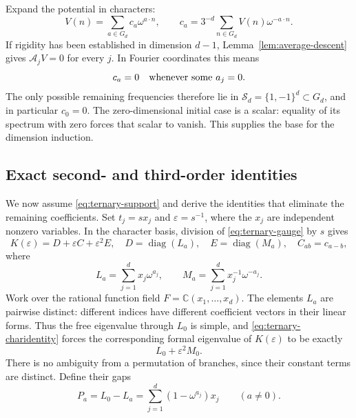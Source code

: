 \documentclass[11pt,a4paper]{article}
\theoremstyle{definition}
\theoremstyle{remark}\newtheorem{remark}[lemma]{Remark}
\newcommand{\C}{\mathbb C}\newcommand{\F}{\mathbb F}
\begin{document}
Expand the potential in characters:
\begin{equation}\label{eq:ternary-fourier}
 V(n)=\sum_{a\in G_d}c_a\omega^{a\cdot n},\qquad
 c_a=3^{-d}\sum_{n\in G_d}V(n)\omega^{-a\cdot n}.
\end{equation}
If rigidity has been established in dimension $d-1$,
Lemma~\ref{lem:average-descent} gives $\mathcal A_jV=0$ for every $j$.
In Fourier coordinates this means
\begin{equation}\label{eq:ternary-support}
 c_a=0\quad\hbox{whenever some }a_j=0.
\end{equation}
The only possible remaining frequencies therefore lie in
$\mathcal S_d=\{1,-1\}^d\subset G_d$, and in particular $c_0=0$.
The zero-dimensional initial case is a scalar: equality of its spectrum
with zero forces that scalar to vanish. This supplies the base for the
dimension induction.

\subsection{Exact second- and third-order identities}

We now assume \eqref{eq:ternary-support} and derive the identities that
eliminate the remaining coefficients. Set $t_j=sx_j$ and
$\varepsilon=s^{-1}$, where the $x_j$ are independent nonzero variables.
In the character basis, division of \eqref{eq:ternary-gauge} by $s$ gives
\begin{equation}\label{eq:ternary-perturbation}
 K(\varepsilon)=D+\varepsilon C+\varepsilon^2E,
 \quad D=\operatorname{diag}(L_a),\quad E=\operatorname{diag}(M_a),
 \quad C_{ab}=c_{a-b},
\end{equation}
where
\[
 L_a=\sum_{j=1}^dx_j\omega^{a_j},\qquad
 M_a=\sum_{j=1}^dx_j^{-1}\omega^{-a_j}.
\]
Work over the rational function field $F=\C(x_1,\ldots,x_d)$. The elements
$L_a$ are pairwise distinct: different indices have different coefficient
vectors in their linear forms. Thus the free eigenvalue through $L_0$
is simple, and \eqref{eq:ternary-charidentity} forces the corresponding
formal eigenvalue of $K(\varepsilon)$ to be exactly
\[
 L_0+\varepsilon^2M_0.
\]
There is no ambiguity from a permutation of branches, since their constant
terms are distinct. Define their gaps
\begin{equation}\label{eq:ternary-gaps}
 P_a=L_0-L_a=\sum_{j=1}^d(1-\omega^{a_j})x_j\qquad(a\ne0).
\end{equation}
\end{document}
